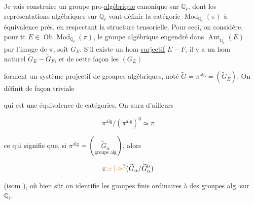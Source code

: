  Je vais construire un groupe pro-\uline{algébrique}  canonique  sur \textcircled{$\mathbb Q_\ell$}, dont les représentations algébriques sur \deleted{$\unsure{\pi}$} $\mathbb Q_\ell$ vont définir la catégorie $\operatorname{Mod}_{\mathbb Q_\ell}(\pi)$ à équivalence près, en respectant la structure tensorielle. Pour ceci, on considère, pour tt $E\in\operatorname{Ob}\operatorname{Mod}_{\mathbb Q_\ell}(\pi)$, le groupe algébrique engendré dans $\underline{\operatorname{Aut}}_{\mathbb Q_\ell}(E)$ par l'image de $\pi$, soit $\widetilde G_E$. S'il existe un hom \uline{surjectif} $E\mathbin{-}F$, il y a un hom naturel $\widetilde G_E\mathbin{-}\widetilde G_F$, et de cette façon les $(G_E)$

forment un système projectif de groupes algébriques, noté $\widetilde G=\pi^{\mathrm{alg}}=(\widetilde G_E)$. On définit de façon triviale


qui est une équivalence de catégories. On aura d'ailleurs

\[
\pi^{\mathrm{alg}}/(\pi^{\mathrm{alg}})^0\simeq\pi
\]

ce qui signifie que, si $\pi^{\mathrm{alg}}=(\underset{\text{groupe alg}}{\widetilde G_\alpha})$, alors

\[
\pi\unsure{\simeq|\approx}(\widetilde G_\alpha/\widetilde G_\alpha^0)
\]

(isom ), où bien sûr on identifie les groupes finis ordinaires à des groupes alg. sur $\mathbb Q_\ell$.

